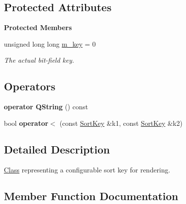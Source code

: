 \subsection*{Protected Attributes}
\begin{Indent}\textbf{ Protected Members}\par
\begin{DoxyCompactItemize}
\item 
\mbox{\label{classrev_1_1_sort_key_a9e4b7c9f23db104b5b266db5378cd207}} 
unsigned long long \mbox{\hyperlink{classrev_1_1_sort_key_a9e4b7c9f23db104b5b266db5378cd207}{m\+\_\+key}} = 0
\begin{DoxyCompactList}\small\item\em The actual bit-\/field key. \end{DoxyCompactList}\end{DoxyCompactItemize}
\end{Indent}
\subsection*{Operators}
\begin{DoxyCompactItemize}
\item 
\mbox{\label{classrev_1_1_sort_key_a352341e6cd6a67de188e9edf3e2c2f94}} 
{\bfseries operator Q\+String} () const
\item 
\mbox{\label{classrev_1_1_sort_key_abba0fa5bdc93876a893858eee73b6b08}} 
bool {\bfseries operator$<$} (const \mbox{\hyperlink{classrev_1_1_sort_key}{Sort\+Key}} \&k1, const \mbox{\hyperlink{classrev_1_1_sort_key}{Sort\+Key}} \&k2)
\end{DoxyCompactItemize}


\subsection{Detailed Description}
\mbox{\hyperlink{struct_class}{Class}} representing a configurable sort key for rendering. 

\subsection{Member Function Documentation}
\mbox{\label{classrev_1_1_sort_key_aaeedcc30c3cf8bf5dff4ccc05eb73299}} 
